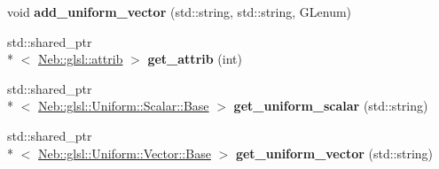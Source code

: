 \begin{DoxyCompactItemize}
\item 
\hypertarget{classNeb_1_1glsl_1_1program_a74d9348322a1a141b54f47b28c8a4fe8}{void {\bfseries add\-\_\-uniform\-\_\-vector} (std\-::string, std\-::string, G\-Lenum)}\label{classNeb_1_1glsl_1_1program_a74d9348322a1a141b54f47b28c8a4fe8}

\item 
\hypertarget{classNeb_1_1glsl_1_1program_a22cb57ef36e27e2c6e4c888ec644d21a}{std\-::shared\-\_\-ptr\\*
$<$ \hyperlink{classNeb_1_1glsl_1_1attrib}{Neb\-::glsl\-::attrib} $>$ {\bfseries get\-\_\-attrib} (int)}\label{classNeb_1_1glsl_1_1program_a22cb57ef36e27e2c6e4c888ec644d21a}

\item 
\hypertarget{classNeb_1_1glsl_1_1program_a2d92e57e7b3baaa0e24d52af68567327}{std\-::shared\-\_\-ptr\\*
$<$ \hyperlink{classNeb_1_1glsl_1_1Uniform_1_1Scalar_1_1Base}{Neb\-::glsl\-::\-Uniform\-::\-Scalar\-::\-Base} $>$ {\bfseries get\-\_\-uniform\-\_\-scalar} (std\-::string)}\label{classNeb_1_1glsl_1_1program_a2d92e57e7b3baaa0e24d52af68567327}

\item 
\hypertarget{classNeb_1_1glsl_1_1program_a05a8949e3d4152aa41900eed48ebed70}{std\-::shared\-\_\-ptr\\*
$<$ \hyperlink{classNeb_1_1glsl_1_1Uniform_1_1Vector_1_1Base}{Neb\-::glsl\-::\-Uniform\-::\-Vector\-::\-Base} $>$ {\bfseries get\-\_\-uniform\-\_\-vector} (std\-::string)}\label{classNeb_1_1glsl_1_1program_a05a8949e3d4152aa41900eed48ebed70}

\end{DoxyCompactItemize}
